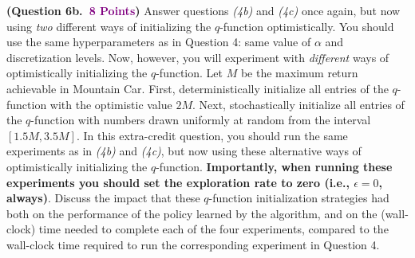 \documentclass{article}
\newcommand{\POINTS}[1]{\textcolor{purple}{\textbf{{#1}}}}
\begin{document}
\begin{enumerate}
\vspace{0.25cm}
\textbf{(Question 6b.~\POINTS{8 Points})} Answer questions \textit{(4b)} and \textit{(4c)} once again, but now using \textit{two} different ways of initializing the $q$-function optimistically. You should use the same hyperparameters as in Question 4: same value of $\alpha$ and discretization levels. Now, however, you will experiment with \textit{different} ways of optimistically initializing the $q$-function. Let $M$ be the maximum return achievable in Mountain Car. First, deterministically initialize all entries of the $q$-function with the optimistic value $2M$. Next, stochastically initialize all entries of the $q$-function with numbers drawn uniformly at random from the interval $[1.5M, 3.5M]$. In this extra-credit question, you should run the same experiments as in \textit{(4b)} and \textit{(4c)}, but now using these alternative ways of optimistically initializing the $q$-function. \textbf{Importantly, when running these experiments you should set the exploration rate to zero (i.e., $\epsilon=0$, always)}. Discuss the impact that these $q$-function initialization strategies had both on the performance of the policy learned by the algorithm, and on the (wall-clock) time needed to complete each of the four experiments, compared to the wall-clock time required to run the corresponding experiment in Question 4.
    
    
    
\end{enumerate}
\end{document}

